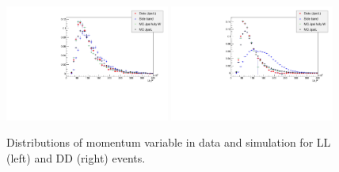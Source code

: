 \begin{figure}[h!]
\centering
\includegraphics[width=0.48\textwidth]{Lmumu/figs/MC_data_comp/Lb_P_plotLL.pdf}
\includegraphics[width=0.48\textwidth]{Lmumu/figs/MC_data_comp/Lb_P_plotDD.pdf}
\caption{ Distributions of \Lb momentum variable in data and simulation for LL (left) and DD (right) events.   }
\end{figure}



